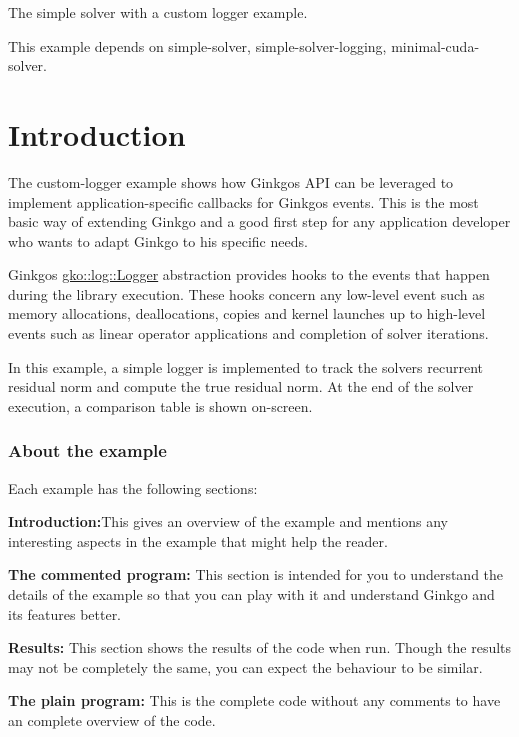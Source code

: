The simple solver with a custom logger example.

This example depends on simple-\/solver, simple-\/solver-\/logging, minimal-\/cuda-\/solver.

 \label{_Intro}%
 \label{_Introduction}%
\section*{Introduction}

The custom-\/logger example shows how Ginkgo\textquotesingle{}s A\+PI can be leveraged to implement application-\/specific callbacks for Ginkgo\textquotesingle{}s events. This is the most basic way of extending Ginkgo and a good first step for any application developer who wants to adapt Ginkgo to his specific needs.

Ginkgo\textquotesingle{}s \hyperlink{classgko_1_1log_1_1Logger}{gko\+::log\+::\+Logger} abstraction provides hooks to the events that happen during the library execution. These hooks concern any low-\/level event such as memory allocations, deallocations, copies and kernel launches up to high-\/level events such as linear operator applications and completion of solver iterations.

In this example, a simple logger is implemented to track the solver\textquotesingle{}s recurrent residual norm and compute the true residual norm. At the end of the solver execution, a comparison table is shown on-\/screen.

\label{_Abouttheexample}%
\subsubsection*{About the example }

Each example has the following sections\+: 
\begin{DoxyEnumerate}
\item {\bfseries Introduction\+:}This gives an overview of the example and mentions any interesting aspects in the example that might help the reader. 
\item {\bfseries The commented program\+:} This section is intended for you to understand the details of the example so that you can play with it and understand Ginkgo and its features better. 
\item {\bfseries Results\+:} This section shows the results of the code when run. Though the results may not be completely the same, you can expect the behaviour to be similar. 
\item {\bfseries The plain program\+:} This is the complete code without any comments to have an complete overview of the code. 
\end{DoxyEnumerate}\label{_CommProg}%
